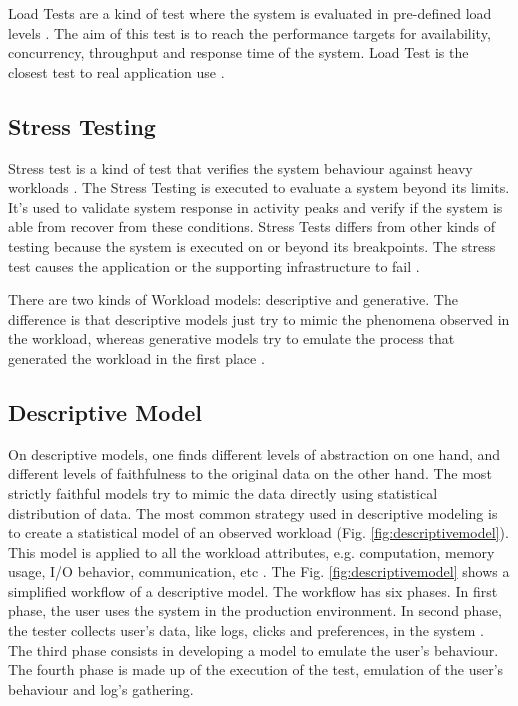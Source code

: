Load Tests are a kind of test where the system is evaluated in pre-defined load levels \cite{DiLucca2006}. The aim of this test is to reach the performance targets for availability, concurrency, throughput and response time of the system. Load Test is the closest test to real application use \cite{Molyneaux2009}.

\subsection{Stress Testing}

Stress test is a kind of test that verifies the system behaviour against heavy workloads \cite{Sandler2004}. The Stress Testing is executed to evaluate a system beyond its limits. It's used to validate system response in activity peaks and verify if the system is able from recover from these conditions. Stress Tests differs from other kinds of testing  because the system is executed on or beyond its breakpoints. The stress test causes the application or the supporting infrastructure to fail \cite{DiLucca2006} \cite{Molyneaux2009}.



There are two kinds of Workload models: descriptive and generative. The difference is that descriptive models just try to mimic the phenomena observed in the workload, whereas generative models try to emulate the process that generated the workload in the first place \cite{DiLucca2006}. 

\subsection{Descriptive Model}

On descriptive models, one finds different levels of abstraction on one hand, and different levels of faithfulness to the original data on the other hand. The
most strictly faithful models try to mimic the data directly using statistical distribution of data. The most common strategy used in descriptive modeling is to create a statistical
model of an observed workload (Fig. \ref{fig:descriptivemodel}). This model is applied to all the workload
attributes, e.g. computation, memory usage, I/O behavior, communication, etc \cite{DiLucca2006}. The Fig. \ref{fig:descriptivemodel} shows a simplified workflow of a descriptive model. The workflow has six phases. In first phase, the user uses the system in the production environment. In second phase, the tester collects user's data, like logs, clicks and preferences, in the system . The third phase consists in developing a model to emulate the user's behaviour. The fourth phase is made up of the execution of the test, emulation of the user's behaviour and log's gathering.

